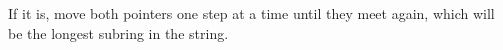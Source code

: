 \documentclass[preview]{standalone}
\begin{document}
If it is, move both pointers one step at a time until they meet again, which will be the longest subring in the string.\\
\end{document}
